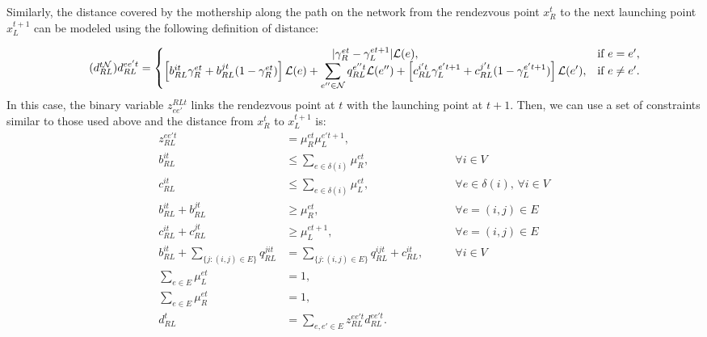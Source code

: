\medskip
\noindent
Similarly, the distance covered by the mothership along the path on the network from the rendezvous point $x_R^t$ to the next launching point $x_L^{t+1}$ can be modeled using the following definition of distance:

\begin{equation}\tag{$d^{t\mathcal N}_{RL}$}\label{eq:dRLNt}
d_{RL}^{ee't} = \left\{\begin{matrix}
|\gamma_{R}^{et} - \gamma_{L}^{et+1}|\mathcal L(e), & \text{if } e = e',\\
\left[b_{RL}^{it}\gamma_{R}^{et} + b_{RL}^{jt}(1 - \gamma_{R}^{et})\right]\mathcal L(e) + \displaystyle \sum_{e''\in \mathcal N}q_{RL}^{e''t}\mathcal L(e'') + \left[c_{RL}^{i't}\gamma_{L}^{e't+1} + c_{RL}^{j't}(1 - \gamma_{L}^{e't+1})\right]\mathcal{L}(e'), & \text{if } e \neq e'.
\end{matrix}\right.
\end{equation}
\noindent
In this case, the binary variable $z_{ee'}^{RLt}$ links the rendezvous point at $t$ with the launching point at $t+1$. Then, we can use a set of constraints similar to those used above and the distance from $x_R^t$ to $x_L^{t+1}$ is:
\begin{align}
    z_{RL}^{ee't} & = \mu_{R}^{et}\mu_{L}^{e't+1},\label{st1:prodRL}\\
    b_{RL}^{it} & \leq \sum_{e\in\delta(i)}\mu_{R}^{et}, \label{st1:bRt1}&\qquad \forall i\in V \\
    c_{RL}^{it} & \leq \sum_{e\in\delta(i)}\mu_{L}^{et}, \label{st1:cRt1}&\qquad \forall e\in\delta(i),\,\forall i\in V\\
    b_{RL}^{it} + b_{RL}^{jt} & \geq \mu_R^{et}, &\qquad \forall e=(i, j)\in E\label{st1:bRt2}\\
    c_{RL}^{it} + c_{RL}^{jt} & \geq \mu_L^{et+1}, &\qquad \forall e=(i, j)\in E\label{st1:cRt2}\\
    b_{RL}^{it} + \sum_{\{j:(i, j)\in E\}} q_{RL}^{jit} & = \sum_{\{j:(i, j)\in E\}} q_{RL}^{ijt} +  c_{RL}^{it}, \label{st1:flow}&\qquad \forall i \in V\\
    \sum_{e\in E} \mu_{L}^{et} & = 1,  \label{st1:muLe} \\
    \sum_{e\in E} \mu_{R}^{et} & = 1, \label{st1:muRe}\\
    d_{RL}^t & = \sum_{e, e'\in E} z_{RL}^{ee't} d_{RL}^{ee't}. \label{st1:dRLtN}
\end{align}
\noindent
